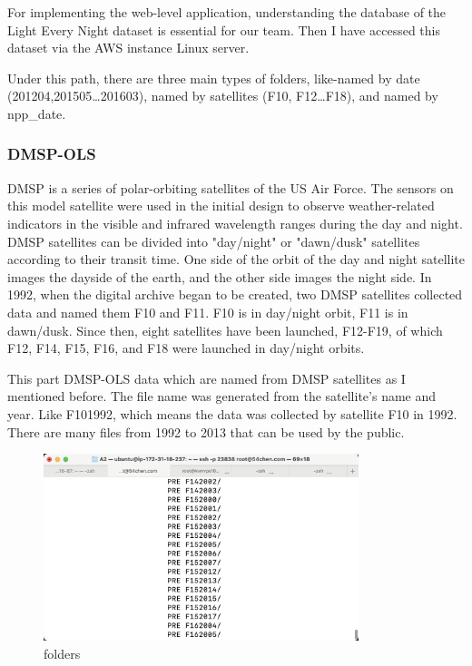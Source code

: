 \documentclass[conference]{IEEEtran}
\begin{document}
For implementing the web-level application, understanding the database of the Light Every Night dataset is essential 
for our team. Then I have accessed this dataset via the AWS instance Linux server. 

Under this path, there are three main types of folders, like-named by date (201204,201505…201603), named by satellites 
(F10, F12…F18), and named by npp\_date.

\subsubsection{DMSP-OLS}

DMSP is a series of polar-orbiting satellites of the US Air Force. The sensors on this model satellite were used in the 
initial design to observe weather-related indicators in the visible and infrared wavelength ranges during the day and night. 
DMSP satellites can be divided into "day/night" or "dawn/dusk" satellites according to their transit time. One side of the 
orbit of the day and night satellite images the dayside of the earth, and the other side images the night side. In 1992, when 
the digital archive began to be created, two DMSP satellites collected data and named them F10 and F11. F10 is in day/night 
orbit, F11 is in dawn/dusk. Since then, eight satellites have been launched, F12-F19, of which F12, F14, F15, F16, and F18 
were launched in day/night orbits.

This part DMSP-OLS data which are named from DMSP satellites as I mentioned before. The file name was generated from the 
satellite's name and year. Like F101992, which means the data was collected by satellite F10 in 1992. There are many files 
from 1992 to 2013 that can be used by the public.

\begin{figure}[htbp]
    \centerline{\includegraphics[width=260pt]{images/2.png}}
    \caption{folders}
    \label{folders}
\end{figure}
\end{document}
